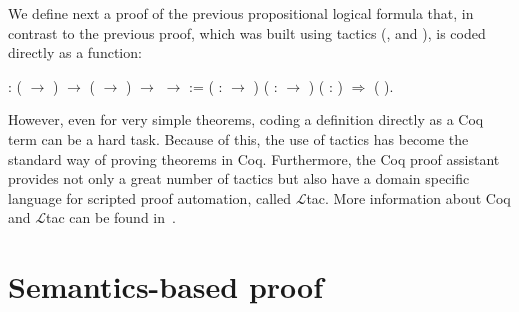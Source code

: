 We define next a proof of the previous propositional logical formula
that, in contrast to the previous proof, which was built using tactics
(,  and ), is coded
directly as a function:
 \begin{coqdoccode}
\coqdocemptyline
\coqdocnoindent
{} \coqdoceol
\coqdocindent{1.00em}
: ( \ensuremath{\rightarrow} ) \ensuremath{\rightarrow} ( \ensuremath{\rightarrow} ) \ensuremath{\rightarrow}  \ensuremath{\rightarrow}  :=\coqdoceol
\coqdocindent{1.50em}
 ( :  \ensuremath{\rightarrow} ) ( :  \ensuremath{\rightarrow} ) ( : ) \ensuremath{\Rightarrow}  ( ).\coqdoceol
\coqdocemptyline
\end{coqdoccode}
However, even for very simple theorems, coding a definition directly
as a Coq term can be a hard task. Because of this, the use of tactics
has become the standard way of proving theorems in Coq. Furthermore,
the Coq proof assistant provides not only a great number of tactics
but also have a domain specific language for scripted proof automation,
called $\mathcal{L}$tac. More information about Coq and  $\mathcal{L}$tac can be found
in~\cite{Chlipala13,Bertot04}.


\section{Semantics-based proof}\label{sec:semantics}


